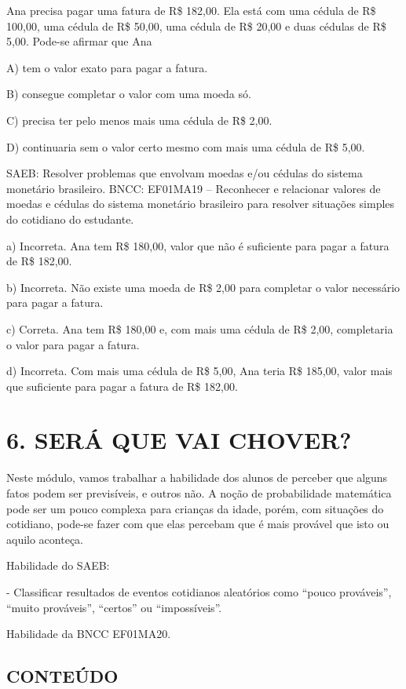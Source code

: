 Ana precisa pagar uma fatura de R\$ 182,00. Ela está com uma cédula de R\$ 100,00, uma cédula de R\$ 50,00, uma cédula de R\$ 20,00 e duas cédulas de R\$ 5,00. Pode-se afirmar que Ana

A) tem o valor exato para pagar a fatura.

B) consegue completar o valor com uma moeda só.

C) precisa ter pelo menos mais uma cédula de R\$ 2,00.

D) continuaria sem o valor certo mesmo com mais uma cédula de R\$ 5,00.

SAEB: Resolver problemas que envolvam moedas e/ou cédulas do
sistema monetário brasileiro.
BNCC: EF01MA19 -- Reconhecer e relacionar valores de moedas e cédulas do
sistema monetário brasileiro para resolver situações simples do
cotidiano do estudante.

a) Incorreta. Ana tem R\$ 180,00, valor que não é suficiente para pagar a fatura de R\$ 182,00.

b) Incorreta. Não existe uma moeda de R\$ 2,00 para completar o valor necessário para pagar a fatura.

c) Correta. Ana tem R\$ 180,00 e, com mais uma cédula de R\$ 2,00, completaria o valor para pagar a fatura.

d) Incorreta. Com mais uma cédula de R\$ 5,00, Ana teria R\$ 185,00, valor mais que suficiente para pagar a fatura de R\$ 182,00.

\section{6. SERÁ QUE VAI
CHOVER?}\label{muxf3dulo-6-seruxe1-que-vai-chover}

Neste módulo, vamos trabalhar a habilidade dos alunos de
perceber que alguns fatos podem ser previsíveis, e outros não. A
noção de probabilidade matemática pode ser um pouco complexa para
crianças da idade, porém, com situações do cotidiano, pode-se fazer com que elas percebam que é mais provável que isto ou aquilo aconteça.

Habilidade do SAEB:

- Classificar resultados de eventos cotidianos aleatórios como ``pouco
prováveis'', ``muito prováveis'', ``certos'' ou ``impossíveis''.

Habilidade da BNCC
EF01MA20.

\subsection{CONTEÚDO}\label{conteuxfado-5}

